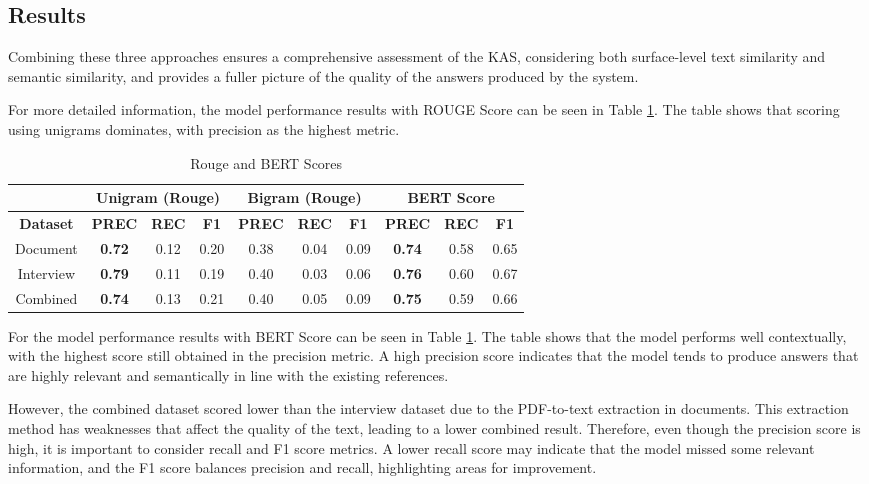 \documentclass[runningheads]{llncs}
\begin{document}
\subsection{Results}
Combining these three approaches ensures a comprehensive assessment of the KAS, considering both surface-level text similarity and semantic similarity, and provides a fuller picture of the quality of the answers produced by the system.

For more detailed information, the model performance results with ROUGE Score can be seen in Table \ref{tab:rouge-bert-table}. The table shows that scoring using unigrams dominates, with precision as the highest metric.

\begin{table}[htbp]
    \centering
    \caption{Rouge and BERT Scores}
    \setlength{\arrayrulewidth}{0.5pt} %
    \renewcommand{\arraystretch}{1.5} %
    \begin{tabular}{|c|c|c|c|c|c|c|c|c|c|}
        \cline{2-10}
        \multicolumn{1}{c|}{} & \multicolumn{3}{c|}{\textbf{Unigram (Rouge)}} & \multicolumn{3}{c|}{\textbf{Bigram (Rouge)}} & \multicolumn{3}{c|}{\textbf{BERT Score}} \\ 
        \hline
        \textbf{Dataset} & \textbf{PREC} & \textbf{REC} & \textbf{F1} & \textbf{PREC} & \textbf{REC} & \textbf{F1} & \textbf{PREC} & \textbf{REC} & \textbf{F1} \\
        \hline
        Document & \textbf{0.72} & 0.12 & 0.20 & 0.38 & 0.04 & 0.09 & \textbf{0.74} & 0.58 & 0.65 \\ 
        \hline
        Interview & \textbf{0.79} & 0.11 & 0.19 & 0.40 & 0.03 & 0.06 & \textbf{0.76} & 0.60 & 0.67 \\ 
        \hline
        Combined & \textbf{0.74} & 0.13 & 0.21 & 0.40 & 0.05 & 0.09 & \textbf{0.75} & 0.59 & 0.66 \\ 
        \hline
    \end{tabular}
    \label{tab:rouge-bert-table}
\end{table}

For the model performance results with BERT Score can be seen in Table  \ref{tab:rouge-bert-table}. The table shows that the model performs well contextually, with the highest score still obtained in the precision metric. A high precision score indicates that the model tends to produce answers that are highly relevant and semantically in line with the existing references.

However, the combined dataset scored lower than the interview dataset due to the PDF-to-text extraction in documents. This extraction method has weaknesses that affect the quality of the text, leading to a lower combined result. Therefore, even though the precision score is high, it is important to consider recall and F1 score metrics. A lower recall score may indicate that the model missed some relevant information, and the F1 score balances precision and recall, highlighting areas for improvement.
\end{document}
